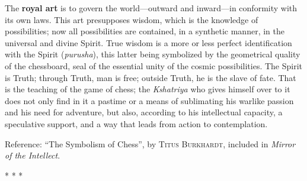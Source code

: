 \begin{quotex}
The \textbf{royal art} is to govern the world---outward and inward---in conformity with its own laws. This art presupposes wisdom, which is the knowledge of possibilities; now all possibilities are contained, in a synthetic manner, in the universal and divine Spirit. True wisdom is a more or less perfect identification with the Spirit (\emph{purusha}), this latter being symbolized by the geometrical quality of the chessboard, seal of the essential unity of the cosmic possibilities. The Spirit is Truth; through Truth, man is free; outside Truth, he is the slave of fate. That is the teaching of the game of chess; the \emph{Kshatriya} who gives himself over to it does not only find in it a pastime or a means of sublimating his warlike passion and his need for adventure, but also, according to his intellectual capacity, a speculative support, and a way that leads from action to contemplation.
\end{quotex}

Reference: ``The Symbolism of Chess'', by \textsc{Titus Burkhardt}, included in \textit{Mirror of the Intellect}.



\begin{center}* * *\end{center}

